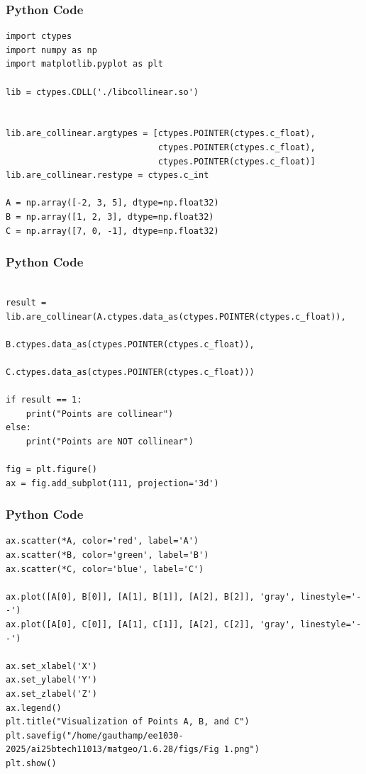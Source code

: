 \documentclass{beamer}
\begin{document}
\begin{frame}[fragile]
    \frametitle{Python Code}
    \begin{lstlisting}
import ctypes
import numpy as np
import matplotlib.pyplot as plt

lib = ctypes.CDLL('./libcollinear.so')


lib.are_collinear.argtypes = [ctypes.POINTER(ctypes.c_float),
                              ctypes.POINTER(ctypes.c_float),
                              ctypes.POINTER(ctypes.c_float)]
lib.are_collinear.restype = ctypes.c_int

A = np.array([-2, 3, 5], dtype=np.float32)
B = np.array([1, 2, 3], dtype=np.float32)
C = np.array([7, 0, -1], dtype=np.float32)
    \end{lstlisting}
\end{frame}

\begin{frame}[fragile]
    \frametitle{Python Code}
    \begin{lstlisting}

result = lib.are_collinear(A.ctypes.data_as(ctypes.POINTER(ctypes.c_float)),
                           B.ctypes.data_as(ctypes.POINTER(ctypes.c_float)),
                           C.ctypes.data_as(ctypes.POINTER(ctypes.c_float)))

if result == 1:
    print("Points are collinear")
else:
    print("Points are NOT collinear")

fig = plt.figure()
ax = fig.add_subplot(111, projection='3d')
    \end{lstlisting}
\end{frame}

\begin{frame}[fragile]
    \frametitle{Python Code}
    \begin{lstlisting}
ax.scatter(*A, color='red', label='A')
ax.scatter(*B, color='green', label='B')
ax.scatter(*C, color='blue', label='C')

ax.plot([A[0], B[0]], [A[1], B[1]], [A[2], B[2]], 'gray', linestyle='--')
ax.plot([A[0], C[0]], [A[1], C[1]], [A[2], C[2]], 'gray', linestyle='--')

ax.set_xlabel('X')
ax.set_ylabel('Y')
ax.set_zlabel('Z')
ax.legend()
plt.title("Visualization of Points A, B, and C")
plt.savefig("/home/gauthamp/ee1030-2025/ai25btech11013/matgeo/1.6.28/figs/Fig 1.png")
plt.show()
    \end{lstlisting}
\end{frame}
\end{document}
